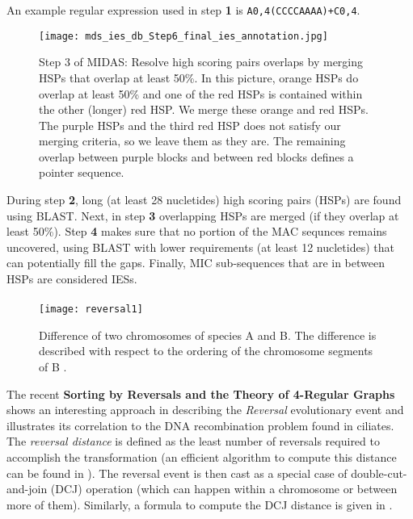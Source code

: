 An example regular expression used in step \textbf{1} is \texttt{A{0,4}(CCCCAAAA)+C{0,4}}.
\begin{figure}[h]
  \centering
    \texttt{[image: mds\_ies\_db\_Step6\_final\_ies\_annotation.jpg]}
  \caption{Step 3 of MIDAS: Resolve high scoring pairs overlaps by merging HSPs that overlap at least 50\%. In this picture, orange HSPs do overlap at least 50\% and one of the red HSPs is contained within the other (longer) red HSP. We merge these orange and red HSPs. The purple HSPs and the third red HSP does not satisfy our merging criteria, so we leave them as they are. The remaining overlap between purple blocks and between red blocks defines a pointer sequence. \cite{midas}}

\end{figure}

During step \textbf{2}, long (at least 28 nucletides) high scoring pairs (HSPs) are found using BLAST. Next, in step \textbf{3} overlapping HSPs are merged (if they overlap at least 50\%).
Step \textbf{4} makes sure that no portion of the MAC sequnces remains uncovered, using BLAST with lower requirements (at least 12 nucletides) that can potentially fill the gaps.
Finally, MIC sub-sequences that are in between HSPs are considered IESs.

\paragraph{}
\begin{figure}[h]

  \centering
    \texttt{[image: reversal1]}

  \caption{ Difference of two chromosomes of species A and B. The difference is described with respect to the ordering of the chromosome segments of B \cite{DBLP:journals/corr/Brijder17}.}
  \label{fig:reversal1}

\end{figure}
The recent \textbf{Sorting by Reversals and the Theory of 4-Regular Graphs} \cite{DBLP:journals/corr/Brijder17} shows an interesting approach in describing the \textit{Reversal} evolutionary event and illustrates its correlation to the DNA recombination problem found in ciliates. The \textit{reversal distance} is defined as the least number of reversals required to accomplish the transformation (an efficient algorithm to compute this distance can be found in \cite{Hannenhalli}). The reversal event is then cast as a special case of double-cut-and-join (DCJ) operation (which can happen within a chromosome or between more of them). Similarly, a formula to compute the DCJ distance is given in \cite{Bergeron2006}.


